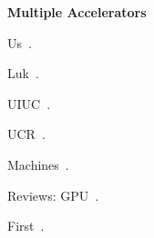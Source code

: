 \documentclass[11pt]{article}
\begin{document}
\pagestyle{plain}
\thispagestyle{plain}

\begin{center}
\textbf{\Large Multiple Accelerators}
\end{center}

Us~\cite{cft+10,ctg+07,ftb+06,shsc08}.

Luk~\cite{ll12,tl10}.

UIUC~\cite{sep+09}.

UCR~\cite{bblg13}.

Machines~\cite{ibs21,kdh+06}.

Reviews: GPU~\cite{mv15}.

First~\cite{khdo06}.



\end{document}

